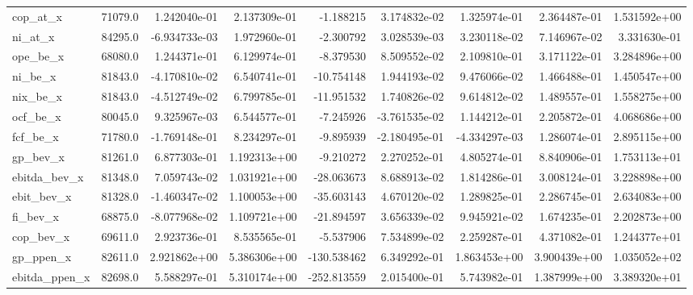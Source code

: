 \documentclass[10pt]{article}
\begin{document}
\begin{landscape}
\begin{longtable}{lrrrrrrrr}
cop\_at\_x                &   71079.0 &  1.242040e-01 &  2.137309e-01 &     -1.188215 &  3.174832e-02 &  1.325974e-01 &  2.364487e-01 &  1.531592e+00 \\
ni\_at\_x                 &   84295.0 & -6.934733e-03 &  1.972960e-01 &     -2.300792 &  3.028539e-03 &  3.230118e-02 &  7.146967e-02 &  3.331630e-01 \\
ope\_be\_x                &   68080.0 &  1.244371e-01 &  6.129974e-01 &     -8.379530 &  8.509552e-02 &  2.109810e-01 &  3.171122e-01 &  3.284896e+00 \\
ni\_be\_x                 &   81843.0 & -4.170810e-02 &  6.540741e-01 &    -10.754148 &  1.944193e-02 &  9.476066e-02 &  1.466488e-01 &  1.450547e+00 \\
nix\_be\_x                &   81843.0 & -4.512749e-02 &  6.799785e-01 &    -11.951532 &  1.740826e-02 &  9.614812e-02 &  1.489557e-01 &  1.558275e+00 \\
ocf\_be\_x                &   80045.0 &  9.325967e-03 &  6.544577e-01 &     -7.245926 & -3.761535e-02 &  1.144212e-01 &  2.205872e-01 &  4.068686e+00 \\
fcf\_be\_x                &   71780.0 & -1.769148e-01 &  8.234297e-01 &     -9.895939 & -2.180495e-01 & -4.334297e-03 &  1.286074e-01 &  2.895115e+00 \\
gp\_bev\_x                &   81261.0 &  6.877303e-01 &  1.192313e+00 &     -9.210272 &  2.270252e-01 &  4.805274e-01 &  8.840906e-01 &  1.753113e+01 \\
ebitda\_bev\_x            &   81348.0 &  7.059743e-02 &  1.031921e+00 &    -28.063673 &  8.688913e-02 &  1.814286e-01 &  3.008124e-01 &  3.228898e+00 \\
ebit\_bev\_x              &   81328.0 & -1.460347e-02 &  1.100053e+00 &    -35.603143 &  4.670120e-02 &  1.289825e-01 &  2.286745e-01 &  2.634083e+00 \\
fi\_bev\_x                &   68875.0 & -8.077968e-02 &  1.109721e+00 &    -21.894597 &  3.656339e-02 &  9.945921e-02 &  1.674235e-01 &  2.202873e+00 \\
cop\_bev\_x               &   69611.0 &  2.923736e-01 &  8.535565e-01 &     -5.537906 &  7.534899e-02 &  2.259287e-01 &  4.371082e-01 &  1.244377e+01 \\
gp\_ppen\_x               &   82611.0 &  2.921862e+00 &  5.386306e+00 &   -130.538462 &  6.349292e-01 &  1.863453e+00 &  3.900439e+00 &  1.035052e+02 \\
ebitda\_ppen\_x           &   82698.0 &  5.588297e-01 &  5.310174e+00 &   -252.813559 &  2.015400e-01 &  5.743982e-01 &  1.387999e+00 &  3.389320e+01 \\

\end{longtable}
\end{landscape}
\end{document}
